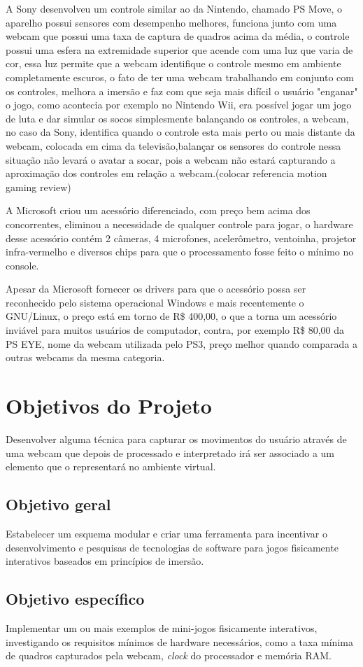  A Sony desenvolveu um controle similar ao da Nintendo, chamado PS Move, o aparelho possui sensores com desempenho melhores, funciona junto com uma webcam que
possui uma taxa de captura de quadros acima da média, o controle possui uma esfera na extremidade superior que acende com uma luz que varia de cor, essa luz
permite que a webcam identifique o controle mesmo em ambiente completamente escuros, o fato de ter uma webcam trabalhando em conjunto com os controles, melhora
a imersão e faz com que seja mais difícil o usuário "enganar" o jogo, como acontecia por exemplo no Nintendo Wii, era possível jogar um jogo de luta e dar simular
os socos simplesmente balançando os controles, a webcam, no caso da Sony, identifica quando o controle esta mais perto ou mais distante da webcam, colocada em
cima da televisão,balançar os sensores do controle nessa situação não levará o avatar a socar, pois a webcam não estará capturando a aproximação dos controles em
relação a webcam.(colocar referencia motion gaming review)

 A Microsoft criou um acessório diferenciado, com preço bem acima dos concorrentes, eliminou a necessidade de qualquer controle para jogar, o hardware desse
acessório contém 2 câmeras, 4 microfones, acelerômetro, ventoinha, projetor infra-vermelho e diversos chips para que o processamento fosse feito o mínimo no
console.\cite{InsideKinect}

 Apesar da Microsoft fornecer os drivers para que o acessório possa ser reconhecido pelo sistema operacional Windows e mais recentemente o GNU/Linux, o preço está
em torno de R\$ 400,00, o que a torna um acessório inviável para muitos usuários de computador,  contra, por exemplo R\$ 80,00 da PS EYE, nome da webcam
utilizada pelo PS3, preço melhor quando comparada a outras webcams da mesma categoria.

\section{Objetivos do Projeto}

 Desenvolver alguma técnica para capturar os movimentos do usuário através de uma webcam que depois de processado e interpretado irá ser associado a um elemento
que o representará no ambiente virtual.

\subsection{Objetivo geral}

 Estabelecer um esquema modular e criar uma ferramenta para incentivar o desenvolvimento e pesquisas de tecnologias de software para jogos fisicamente interativos
baseados em princípios de imersão.

\subsection{Objetivo específico}

 Implementar um ou mais exemplos de mini-jogos fisicamente interativos, investigando os requisitos mínimos de hardware necessários, como a taxa mínima de quadros
capturados pela webcam, \textit{clock} do processador e memória RAM.

